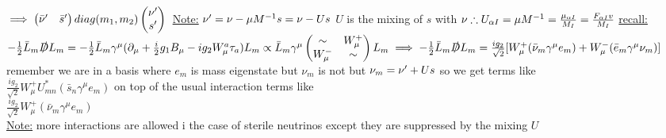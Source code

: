 \documentclass[12pt]{amsart}
\begin{document}
\begin{enumerate}
$\implies \begin{pmatrix} \bar{\nu}' & \bar{s}' \end{pmatrix} diag (m_1, m_2 ) \begin{pmatrix} \nu' \\ s' \end{pmatrix}\\$
\underline{Note:} $\nu' = \nu - \mu M^{-1} s = \nu - U s\\$
$U$ is the mixing of $s$ with $\nu\\
\therefore U_{\alpha I} = \mu M^{-1} = \frac{\mu_{\alpha I}}{M_I} = \frac{F_{\alpha I} v}{M_I}\\$
\underline{recall:} $- \frac{1}{2} \bar{L}_m \slashed{D} L_m = - \frac{1}{2} \bar{L}_m \gamma^{\mu} ( \partial_{\mu} + \frac{i}{2} g_1 B_{\mu} - i g_2 W_{\mu}^a \tau_a ) L_m\\
\propto \bar{L}_m \gamma^{\mu} \begin{pmatrix} \sim & W_{\mu}^+ \\ W_{\mu}^- & \sim \end{pmatrix} L_m\\
\implies - \frac{1}{2} \bar{L}_m \slashed{D} L_m = \frac{i g_2}{\sqrt{2}} [ W_{\mu}^+ ( \bar{\nu}_m \gamma^{\mu} e_m ) + W_{\mu}^- ( \bar{e}_m \gamma^{\mu} \nu_m)]\\$
remember we are in a basis where $e_m$ is mass eigenstate but $\nu_m$ is not but $\nu_m = \nu' + Us\\$
so we get terms like \\
$\frac{i g_2}{\sqrt{2}} W_{\mu}^+ U_{m n}^* ( \bar{s}_n \gamma^{\mu} e_m )$ on top of the usual interaction terms like\\
$\frac{i g_2}{\sqrt{2}} W_{\mu}^{+} ( \bar{\nu}_m \gamma^{\mu} e_m)$ \\
\underline{Note:} more interactions are allowed i the case of sterile neutrinos except they are suppressed by the mixing $U$



\end{enumerate}
\end{document}
